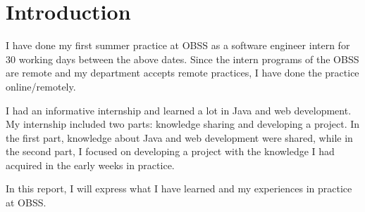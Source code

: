 \section{Introduction}

I have done my first summer practice at OBSS as a software engineer intern for 30 working days between the above dates. Since the intern programs of the OBSS are remote and my department accepts remote practices, I have done the practice online/remotely.

I had an informative internship and learned a lot in Java and web development. My internship included two parts: knowledge sharing and developing a project. In the first part, knowledge about Java and web development were shared, while in the second part, I focused on developing a project with the knowledge I had acquired in the early weeks in practice.

In this report, I will express what I have learned and my experiences in practice at OBSS.
